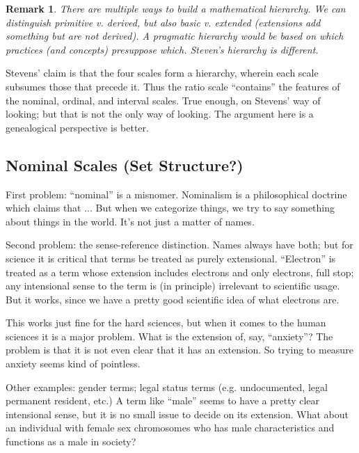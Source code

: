 \documentclass[11pt,twoside]{article}
\newtheorem{remark}{Remark}
\begin{document}
\begin{remark}
  There are multiple ways to build a mathematical hierarchy.  We can
  distinguish primitive v. derived, but also basic v. extended
  (extensions add something but are not derived).  A pragmatic
  hierarchy would be based on which practices (and concepts)
  presuppose which.  Steven's hierarchy is different.
\end{remark}

Stevens' claim is that the four scales form a hierarchy, wherein each
scale subsumes those that precede it.  Thus the ratio scale
``contains'' the features of the nominal, ordinal, and interval
scales.  True enough, on Stevens' way of looking; but that is not the
only way of looking.  The argument here is a genealogical perspective
is better.

\subsection{Nominal Scales (Set Structure?)}

First problem: ``nominal'' is a misnomer.  Nominalism is a
philosophical doctrine which claims that ...  But when we categorize
things, we try to say something about things in the world.  It's not
just a matter of names.

Second problem: the sense-reference distinction.  Names always have
both; but for science it is critical that terms be treated as purely
extensional.  ``Electron'' is treated as a term whose extension
includes electrons and only electrons, full stop; any intensional
sense to the term is (in principle) irrelevant to scientific usage.
But it works, since we have a pretty good scientific idea of what
electrons are.

This works just fine for the hard sciences, but when it comes to the
human sciences it is a major problem.  What is the extension of, say,
``anxiety''?  The problem is that it is not even clear that it has an
extension.  So trying to measure anxiety seems kind of pointless.

Other examples: gender terms; legal status terms (e.g. undocumented,
legal permanent resident, etc.)  A term like ``male'' seems to have a
pretty clear intensional sense, but it is no small issue to decide on
its extension.  What about an individual with female sex chromosomes
who has male characteristics and functions as a male in society?
\end{document}
